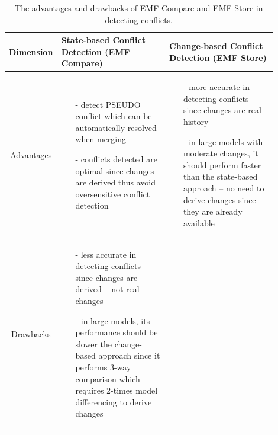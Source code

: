 \begin{table}[]
  \centering
  \caption{The advantages and drawbacks of EMF Compare and EMF Store in detecting conflicts.}
  \label{tab:accuracy_emfcompare_emfstore}
  \begin{tabular}{|p{0.1\linewidth}|p{0.4\linewidth}|p{0.4\linewidth}|}
    \hline
    \textbf{Dimension}
    & \textbf{State-based Conflict Detection (EMF Compare)}
    & \textbf{Change-based Conflict Detection (EMF Store)}\\
    \hline
    \multicolumn{1}{|c|}{Advantages}
    &
    \begin{minipage}[t]{\linewidth}
      \raggedright
      \begin{itemize}[leftmargin=9pt]
        \setlength\itemsep{2pt}
        \item[-] detect \textsf{PSEUDO} conflict which can be automatically resolved when merging
        \item[-] conflicts detected are optimal since changes are derived thus avoid oversensitive conflict detection
        \item[]
      \end{itemize}
    \end{minipage}
    &
    \begin{minipage}[t]{\linewidth}
      \raggedright
      \begin{itemize}[leftmargin=9pt]
        \setlength\itemsep{2pt}
        \item[-] more accurate in detecting conflicts since changes are real history
        \item[-] in large models with moderate changes, it should perform faster than the state-based approach -- no need to derive changes since they are already available 
        \item[]
      \end{itemize} 
    \end{minipage}
    \\ 
    \hline
    \multicolumn{1}{|c|}{Drawbacks}
    &
    \begin{minipage}[t]{\linewidth}
      \raggedright
      \begin{itemize}[leftmargin=9pt]
        \setlength\itemsep{2pt}
        \item[-] less accurate in detecting conflicts since changes are derived -- not real changes
        \item[-] in large models, its performance should be slower the change-based approach since it performs 3-way comparison which requires 2-times model differencing to derive changes

\end{itemize}
\end{minipage}
\end{tabular}
\end{table}
